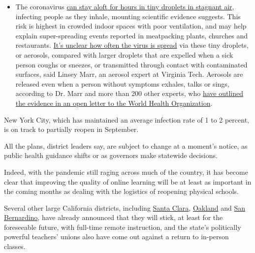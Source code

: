\begin{itemize}
  \begin{itemize}
  \tightlist
  \item
    The coronavirus
    \href{https://www.nytimes3xbfgragh.onion/2020/07/04/health/239-experts-with-one-big-claim-the-coronavirus-is-airborne.html?action=click\&pgtype=Article\&state=default\&region=MAIN_CONTENT_3\&context=storylines_faq}{can
    stay aloft for hours in tiny droplets in stagnant air}, infecting
    people as they inhale, mounting scientific evidence suggests. This
    risk is highest in crowded indoor spaces with poor ventilation, and
    may help explain super-spreading events reported in meatpacking
    plants, churches and restaurants.
    \href{https://www.nytimes3xbfgragh.onion/2020/07/06/health/coronavirus-airborne-aerosols.html?action=click\&pgtype=Article\&state=default\&region=MAIN_CONTENT_3\&context=storylines_faq}{It's
    unclear how often the virus is spread} via these tiny droplets, or
    aerosols, compared with larger droplets that are expelled when a
    sick person coughs or sneezes, or transmitted through contact with
    contaminated surfaces, said Linsey Marr, an aerosol expert at
    Virginia Tech. Aerosols are released even when a person without
    symptoms exhales, talks or sings, according to Dr. Marr and more
    than 200 other experts, who
    \href{https://academic.oup.com/cid/article/doi/10.1093/cid/ciaa939/5867798}{have
    outlined the evidence in an open letter to the World Health
    Organization}.
  \end{itemize}
\end{itemize}

New York City, which has maintained an average infection rate of 1 to 2
percent, is on track to partially reopen in September.

All the plans, district leaders say, are subject to change at a moment's
notice, as public health guidance shifts or as governors make statewide
decisions.

Indeed, with the pandemic still raging across much of the country, it
has become clear that improving the quality of online learning will be
at least as important in the coming months as dealing with the logistics
of reopening physical schools.

Several other large California districts, including
\href{https://www.sfchronicle.com/bayarea/article/Santa-Clara-area-school-district-delays-return-to-15403000.php}{Santa
Clara}, \href{https://www.ousd.org/covid-19updates}{Oakland} and
\href{https://www.sbcusd.com/news/what_s_new/July22020_message_from_interim_superintendent}{San
Bernardino}, have already announced that they will stick, at least for
the foreseeable future, with full-time remote instruction, and the
state's politically powerful teachers' unions also have come out against
a return to in-person classes.

